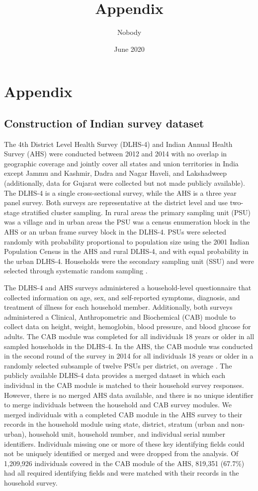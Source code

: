 \documentclass[10pt,letterpaper]{article}
\title{Appendix} \author{Nobody}
\numberwithin{equation}{section}
\begin{document}
\date{June 2020}
\section{Appendix}
\subsection{Construction of Indian survey dataset}
The 4th District Level Health Survey (DLHS-4) and Indian Annual Health Survey (AHS) were conducted between 2012 and 2014 with no overlap in geographic coverage and jointly cover all states and union territories in India except Jammu and Kashmir, Dadra and Nagar Haveli, and Lakshadweep (additionally, data for Gujarat were collected but not made publicly available). The DLHS-4 is a single cross-sectional survey, while the AHS is a three year panel survey. Both surveys are representative at the district level and use two-stage stratified cluster sampling. In rural areas the primary sampling unit (PSU) was a village and in urban areas the PSU was a census enumeration block in the AHS or an urban frame survey block in the DLHS-4. PSUs were selected randomly with probability proportional to population size using the 2001 Indian Population Census in the AHS and rural DLHS-4, and with equal probability in the urban DLHS-4. Households were the secondary sampling unit (SSU) and were selected through systematic random sampling \cite{noauthor_annual_2014-1}.

The DLHS-4 and AHS surveys administered a household-level questionnaire that collected information on age, sex, and self-reported symptoms, diagnosis, and treatment of illness for each household member. Additionally, both surveys administered a Clinical, Anthropometric and Biochemical (CAB) module to collect data on height, weight, hemoglobin, blood pressure, and blood glucose for adults. The CAB module was completed for all individuals 18 years or older in all sampled households in the DLHS-4. In the AHS, the CAB module was conducted in the second round of the survey in 2014 for all individuals 18 years or older in a randomly selected subsample of twelve PSUs per district, on average \cite{noauthor_annual_2014}. The publicly available DLHS-4 data provides a merged dataset in which each individual in the CAB module is matched to their household survey responses. However, there is no merged AHS data available, and there is no unique identifier to merge individuals between the household and CAB survey modules. We merged individuals with a completed CAB module in the AHS survey to their records in the household module using state, district, stratum (urban and non-urban), household unit, household number, and individual serial number identifiers. Individuals missing one or more of these key identifying fields could not be uniquely identified or merged and were dropped from the analysis. Of 1,209,926 individuals covered in the CAB module of the AHS, 819,351 (67.7\%) had all required identifying fields and were matched with their records in the household survey.  
\end{document}
